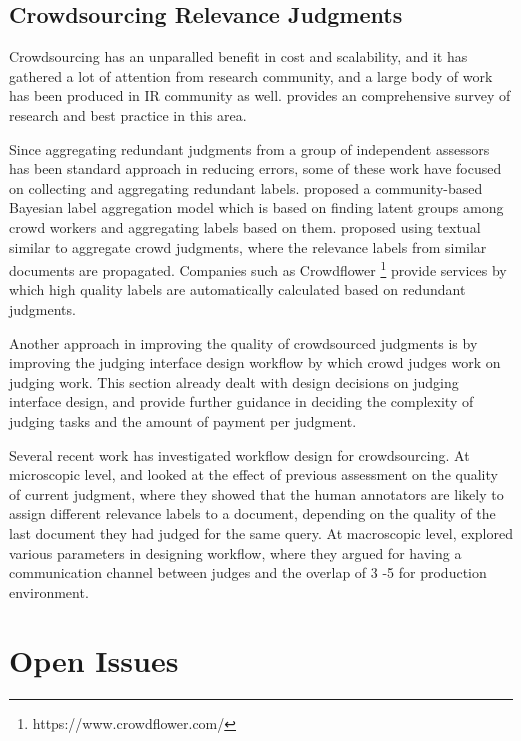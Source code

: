\documentclass[openany]{now} %
\begin{document}
\subsection{Crowdsourcing Relevance Judgments}

Crowdsourcing has an unparalled benefit in cost and scalability, and it has gathered a lot of attention from research community, and a large body of work has been produced in IR community as well. \cite{Alonso2012} provides an comprehensive survey of research and best practice in this area. 

Since aggregating redundant judgments from a group of independent assessors has been standard approach in reducing errors, some of these work have focused on collecting and aggregating redundant labels. \cite{Venanzi:2014} proposed a community-based Bayesian label aggregation model which is based on finding latent groups among crowd workers and aggregating labels based on them. \cite{Davtyan2015} proposed using textual similar to aggregate crowd judgments, where the relevance labels from similar documents are propagated. Companies such as Crowdflower \footnote{https://www.crowdflower.com/} provide services by which high quality labels are automatically calculated based on redundant judgments.

Another approach in improving the quality of crowdsourced judgments is by improving the judging interface design workflow by which crowd judges work on judging work. This section already dealt with design decisions on judging interface design, and \cite{Kazai2012} provide further guidance in deciding the complexity of judging tasks and the amount of payment per judgment.

Several recent work has investigated workflow design for crowdsourcing. At microscopic level, \cite{Shokouhi:2015} and \cite{Scholer:2013} looked at the effect of previous assessment on the quality of current judgment, where they showed that the human annotators are likely to assign different relevance labels to a document, depending on the quality of the last document they had judged for the same query. At macroscopic level, \cite{Megorskaya2015} explored various parameters in designing workflow, where they argued for having a communication channel between judges and the overlap of 3 -5 for production environment.

\section{Open Issues}
\end{document}
